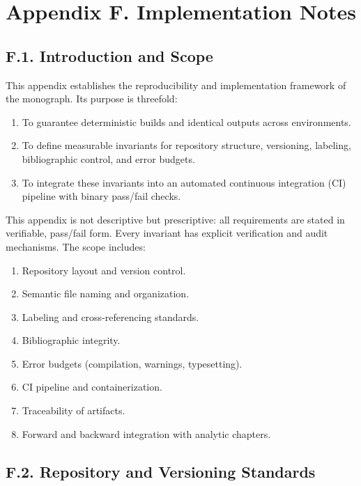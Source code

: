 \section*{Appendix F. Implementation Notes}

\subsection*{F.1. Introduction and Scope}

This appendix establishes the reproducibility and implementation
framework of the monograph. Its purpose is threefold:
\begin{enumerate}
  \item To guarantee deterministic builds and identical outputs across
        environments.
  \item To define measurable invariants for repository structure,
        versioning, labeling, bibliographic control, and error budgets.
  \item To integrate these invariants into an automated continuous
        integration (CI) pipeline with binary pass/fail checks.
\end{enumerate}

\noindent This appendix is not descriptive but prescriptive:
all requirements are stated in verifiable, pass/fail form.
Every invariant has explicit verification and audit mechanisms.
The scope includes:
\begin{enumerate}
  \item Repository layout and version control.
  \item Semantic file naming and organization.
  \item Labeling and cross-referencing standards.
  \item Bibliographic integrity.
  \item Error budgets (compilation, warnings, typesetting).
  \item CI pipeline and containerization.
  \item Traceability of artifacts.
  \item Forward and backward integration with analytic chapters.
\end{enumerate}

\subsection*{F.2. Repository and Versioning Standards}

